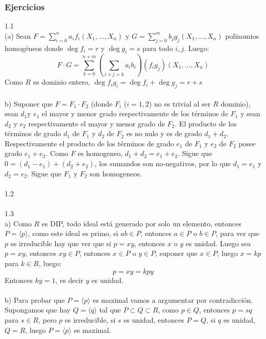 \documentclass{article}
\begin{document}
\subsubsection*{Ejercicios}
1.1
\\
(a) Sean $F=\sum_{i=0}^{n}a_i f_i(X_1,\dots,X_n)$ y $G=\sum_{j=0}^{m} b_j g_j(X_1, \dots, X_n)$ polinomios homogéneos donde $\deg{f_i}=r$ y $\deg{g_i}=s$ para todo $i,j$. Luego:
\begin{equation*}
    F \cdot G = \sum_{k=0}^{n+m} \left( \sum_{i+j=k}a_i b_i\right) (f_i g_j)(X_1, \dots, X_n)
\end{equation*}
Como $R$ es dominio entero, $\deg{f_i g_i}= \deg{f_i} + \deg{g_j}=r+s$
\\
\\
b) Suponer que $F=F_1 \cdot F_2$ (donde $F_i$ ($i=1,2$) no es trivial al ser $R$ dominio), sean $d_1$y $e_1$ el mayor y menor grado respectivamente de los términos de $F_1$ y sean $d_2$ y $e_2$ respectivamente el mayor y menor grado de $F_2$. El producto de los términos de grado $d_1$ de $F_1$ y $d_2$ de $F_2$ es no nulo y es de grado $d_1 + d_2$. Respectivamente el producto de los términos de grado $e_1$ de $F_1$ y $e_2$ de $F_2$ posee grado $e_1 +e_2$. Como $F$ es homogeneo, $d_1 + d_2 = e_1 + e_2$. Sigue que $0=(d_1 - e_1)+ (d_2 + e_2)$, los sumandos son no-negativos, por lo que $d_1=e_1$ y $d_2 = e_2$. Sigue que $F_1$ y $F_2$ son homogeneos.
\\
\\
1.2
\\
\\
1.3
\\
a) Como $R$ es DIP, todo ideal está generado por solo un elemento, entonces $P=\langle p \rangle$, como este ideal es primo, si $ab \in P$, entonces $a \in P$ o $b \in P$, para ver que $p$ es irreducible hay que ver que si $p=xy$, entonces $x$ o $y$ es unidad. Luego sea $p=xy$, entonces $xy \in P$, entonces $x \in P$ o $y \in P$, suponer que $x \in P$, luego $x=kp$ para $k \in R$, luego:
\begin{equation*}
    p=xy=kpy
\end{equation*}
Entonces $ky=1$, es decir $y$ es unidad.
\\
\\
b) Para probar que $P=\langle p \rangle$ es maximal vamos a argumentar por contradicción. Supongamos que hay $Q=\langle q \rangle$ tal que $P \subset Q \subset R$, como $p \in Q$, entonces $p=sq$ para $s \in R$, pero $p$ es irreducible, si $s$ es unidad, entonces $P=Q$, si $q$ es unidad, $Q=R$, luego $P=\langle p \rangle$ es maximal.
\end{document}

